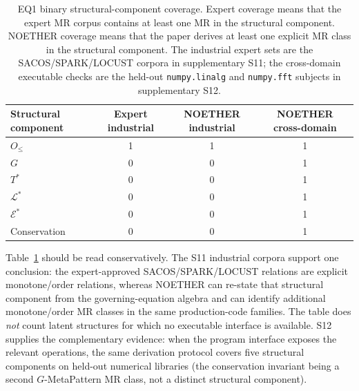 \documentclass[acmsmall,screen,review]{acmart}
\begin{document}
\begin{table}[h]
\centering
\caption{EQ1 binary structural-component coverage. Expert coverage means that the
expert MR corpus contains at least one MR in the structural component. NOETHER coverage means
that the paper derives at least one explicit MR class in the structural component. The
industrial expert sets are the SACOS/SPARK/LOCUST corpora in supplementary S11;
the cross-domain executable checks are the held-out \texttt{numpy.linalg} and
\texttt{numpy.fft} subjects in supplementary S12.}
\label{tab:expert-noether-binary-coverage}
\small
\begin{tabular}{lccc}
\toprule
Structural component & Expert industrial & NOETHER industrial & NOETHER cross-domain \\
\midrule
$O_{\le}$ & 1 & 1 & 1 \\
$G$ & 0 & 0 & 1 \\
$T^{*}$ & 0 & 0 & 1 \\
$\mathcal{L}^{*}$ & 0 & 0 & 1 \\
$\mathcal{E}^{*}$ & 0 & 0 & 1 \\
Conservation & 0 & 0 & 1 \\
\bottomrule
\end{tabular}
\end{table}

Table~\ref{tab:expert-noether-binary-coverage} should be read conservatively.
The S11 industrial corpora support one conclusion: the expert-approved
SACOS/SPARK/LOCUST relations are explicit monotone/order relations, whereas
NOETHER can re-state that structural component from the governing-equation algebra and can
identify additional monotone/order MR classes in the same production-code
families. The table does \emph{not} count latent structures for which no
executable interface is available. S12 supplies the complementary evidence:
when the program interface exposes the relevant operations, the same derivation
protocol covers five structural components on held-out numerical libraries (the conservation invariant being a second $G$-MetaPattern MR class, not a distinct structural component).
\end{document}

